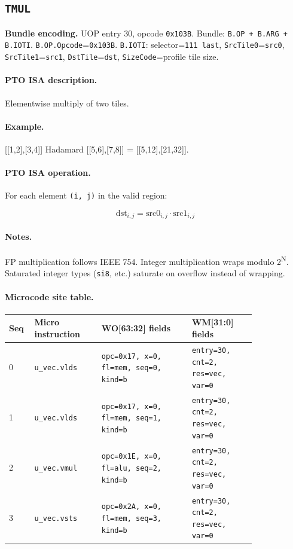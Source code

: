 \subsection{\texttt{TMUL}}
\noindent\textbf{Bundle encoding.} UOP entry 30, opcode \texttt{0x103B}. Bundle: \texttt{B.OP + B.ARG + B.IOTI}. \texttt{B.OP.Opcode}=\texttt{0x103B}. \texttt{B.IOTI}: selector=\texttt{111 last}, \texttt{SrcTile0}=\texttt{src0}, \texttt{SrcTile1}=\texttt{src1}, \texttt{DstTile}=\texttt{dst}, \texttt{SizeCode}=profile tile size.\par\smallskip
{\small
\paragraph{PTO ISA description.}
Elementwise multiply of two tiles.
\paragraph{Example.}
[[1,2],[3,4]] Hadamard [[5,6],[7,8]] = [[5,12],[21,32]].
\par\smallskip
\paragraph{PTO ISA operation.}
For each element \texttt{(i, j)} in the valid region:

\[
\mathrm{dst}_{i,j} = \mathrm{src0}_{i,j} \cdot \mathrm{src1}_{i,j}
\]
}\par\smallskip
\paragraph{Notes.}
FP multiplication follows IEEE 754. Integer multiplication wraps modulo 2\textsuperscript{N}. Saturated integer types (\texttt{si8}, etc.) saturate on overflow instead of wrapping.
\paragraph{Microcode site table.}
{\scriptsize
\begin{longtable}{@{}R{0.055\linewidth}L{0.23\linewidth}L{0.31\linewidth}L{0.22\linewidth}@{}}
\toprule
Seq & Micro instruction & WO[63:32] fields & WM[31:0] fields \\
 & \texttt{u\_vec.vlds} & \texttt{opc=0x17, x=0, fl=mem, seq=0, kind=b} & \texttt{entry=30, cnt=2, res=vec, var=0} \\
1 & \texttt{u\_vec.vlds} & \texttt{opc=0x17, x=0, fl=mem, seq=1, kind=b} & \texttt{entry=30, cnt=2, res=vec, var=0} \\
2 & \texttt{u\_vec.vmul} & \texttt{opc=0x1E, x=0, fl=alu, seq=2, kind=b} & \texttt{entry=30, cnt=2, res=vec, var=0} \\
3 & \texttt{u\_vec.vsts} & \texttt{opc=0x2A, x=0, fl=mem, seq=3, kind=b} & \texttt{entry=30, cnt=2, res=vec, var=0} \\
\bottomrule
\end{longtable}
}

